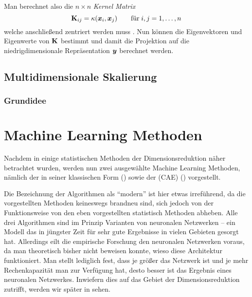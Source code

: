 Man berechnet also die $n \times n$ \textit{Kernel Matrix}
\begin{equation}
	\mathbf{K}_{ij} = \kappa(\bm{x}_i, \bm{x}_j) \qquad \text{für}\; i,j = 1,\ldots,n
\end{equation}
welche anschließend zentriert werden muss \parencite[598]{Bishop.2006}. Nun können die Eigenvektoren und Eigenwerte von $\mathbf{K}$ bestimmt und
damit die Projektion auf die niedrigdimensionale Repräsentation $\bm{y}$ berechnet
werden.

\subsection{Multidimensionale Skalierung}
\label{ch:MethodenDerDimRed:statistisch:MDS}

\subsubsection{Grundidee}

\newpage

\section{Machine Learning Methoden}
\label{ch:MethodenDerDimRed:modern}
Nachdem in  einige statistischen Methoden der
Dimensionsreduktion näher betrachtet wurden, werden nun zwei ausgewählte Machine Learning Methoden,
nämlich der  in seiner klassischen Form
() sowie der  (CAE)
() vorgestellt.

Die Bezeichnung der Algorithmen als \enquote{modern} ist hier etwas irreführend, da die
vorgestellten Methoden keineswegs brandneu sind, sich jedoch von der Funktionsweise von den eben vorgestellten statistisch Methoden
abheben. Alle drei Algorithmen sind im Prinzip Varianten von neuronalen Netzwerken -- ein Modell
das in jüngster Zeit für sehr gute Ergebnisse in vielen Gebieten gesorgt hat. Allerdings eilt die
empirische Forschung den neuronalen Netzwerken voraus, da man theoretisch bisher nicht beweisen
konnte, wieso diese Architektur funktioniert. Man stellt lediglich fest, dass je größer das
Netzwerk ist und je mehr Rechenkapazität man zur Verfügung hat, desto besser ist das Ergebnis eines
neuronalen Netzwerkes\addref. Inwiefern dies auf das Gebiet der Dimensionsreduktion zutrifft,
werden wir später in  sehen.

